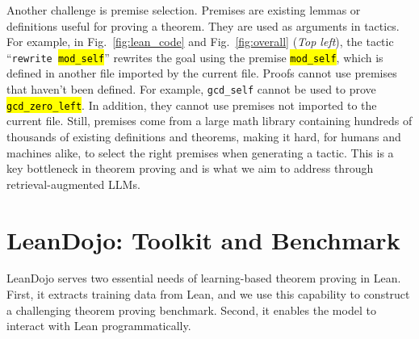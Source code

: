 \documentclass{article}
\DeclareRobustCommand{\hlgreen}[1]{{\sethlcolor{mygreen}\hl{#1}}}
\DeclareRobustCommand{\hlorange}[1]{{\sethlcolor{myorange}\hl{#1}}}
\begin{document}
Another challenge is premise selection. Premises are existing lemmas or definitions useful for proving a theorem. They are used as arguments in tactics. For example, in Fig.~\ref{fig:lean_code} and Fig.~\ref{fig:overall} (\emph{Top left}), the tactic ``\texttt{rewrite \hlorange{mod\_self}}'' rewrites the goal using the premise \hlorange{\texttt{mod\_self}}, which is defined in another file imported by the current file. Proofs cannot use premises that haven't been defined. For example, \texttt{gcd\_self} cannot be used to prove \hlgreen{\texttt{gcd\_zero\_left}}. In addition, they cannot use premises not imported to the current file. Still, premises come from a large math library containing hundreds of thousands of existing definitions and theorems, making it hard, for humans and machines alike, to select the right premises when generating a tactic. This is a key bottleneck in theorem proving and is what we aim to address through retrieval-augmented LLMs.





\section{LeanDojo: Toolkit and Benchmark}
\label{sec:leandojo}

LeanDojo serves two essential needs of learning-based theorem proving in Lean. First, it extracts training data from Lean, and we use this capability to construct a challenging theorem proving benchmark. Second, it enables the model to interact with Lean programmatically.
\end{document}
